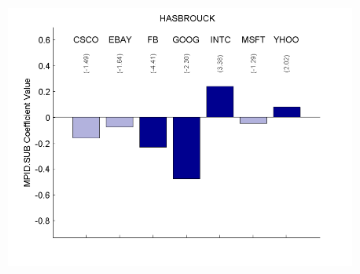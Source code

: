\documentclass{article}
\begin{document}
\begin{figure}[htp!]
\begin{subfigure}{0.31\textwidth}
\includegraphics[width=\linewidth]{docs/Regression_Ratio_30sec_26_MPID_SUB_1MPIDLags_5DepVarLags.pdf}
\end{subfigure}

\begin{minipage}{\textwidth}
\footnotesize
\end{minipage}
\end{figure}
\end{document}
